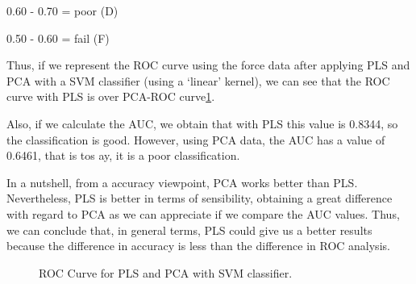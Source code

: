 0.60 - 0.70 = poor (D)

0.50 - 0.60 = fail (F)

Thus, if we represent the ROC curve using the force data after applying PLS and PCA with a SVM classifier (using a ‘linear’ kernel), we can see that the ROC curve with PLS is over PCA-ROC curve\ref{fig:ROC}.

Also, if we calculate the AUC, we obtain that with PLS this value is 0.8344, so the classification is good. However, using PCA data, the AUC has a value of 0.6461, that is tos ay, it is a poor classification.

In a nutshell, from a accuracy viewpoint, PCA works better than PLS. Nevertheless, PLS is better in terms of sensibility, obtaining a great difference with regard to PCA as we can appreciate if we compare the AUC values. Thus, we can conclude that, in general terms, PLS could give us a better results because the difference in accuracy is less than the difference in ROC analysis.

\begin{figure}[H]
	\centering
	\caption{ROC Curve for PLS and PCA with SVM classifier.}
	\label{fig:ROC}
\end{figure}

 
